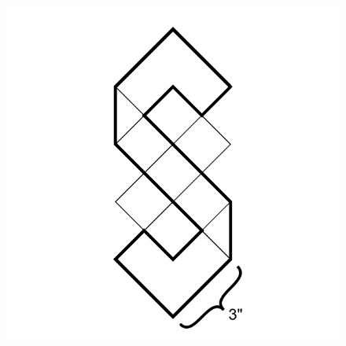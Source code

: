 \documentclass[17pt]{extreport}
\begin{document}
	\begin{figure}
		\centering
		\includegraphics[width=7.75in]{imageserver/uploadimages/image10.png}
	\end{figure}	
\end{document}
